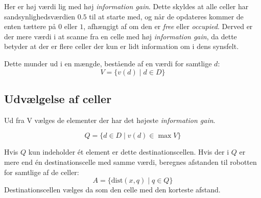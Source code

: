 Her er høj værdi lig med høj \textit{information gain}.
Dette skyldes at alle celler har sandsynlighedsværdien $0.5$ til at starte med, og når de opdateres kommer de enten tættere på $0$ eller $1$, afhængigt af om den er \textit{free} eller \textit{occupied}.
Derved er der mere værdi i at scanne fra en celle med høj \textit{information gain}, da dette betyder at der er flere celler der kun er lidt information om i dens synsfelt.

Dette munder ud i en mængde, bestående af en værdi for samtlige $d$:
\begin{equation}
V = \{ v(d) \mid d \in D \}
\end{equation}

\subsection{Udvælgelse af celler }
Ud fra V vælges de elementer der har det højeste \textit{information gain}. 


\begin{equation}
Q = \{ d \in D \mid v(d) \in \max V \}
\end{equation}

Hvis $ Q $ kun indeholder ét element er dette destinationscellen. 
Hvis der i $Q$ er mere end én destinationscelle med samme værdi, beregnes afstanden til robotten for samtlige af de celler:
\begin{equation}
A = \{ \text{dist}(x,q) \mid q \in Q \}
\end{equation}
Destinationscellen vælges da som den celle med den korteste afstand.
